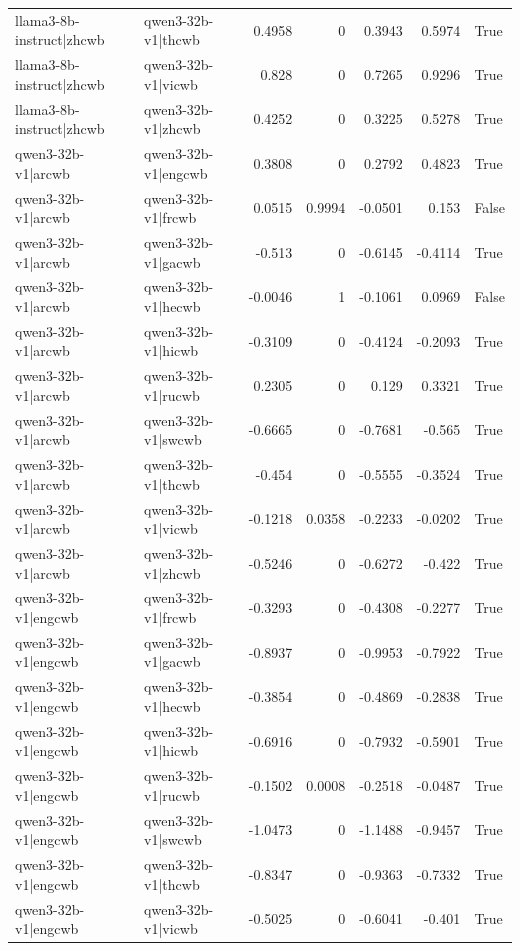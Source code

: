 \begin{table}
\begin{tabular}{l l r r r r l}
llama3-8b-instruct|zhcwb & qwen3-32b-v1|thcwb & 0.4958 & 0 & 0.3943 & 0.5974 & True \\
llama3-8b-instruct|zhcwb & qwen3-32b-v1|vicwb & 0.828 & 0 & 0.7265 & 0.9296 & True \\
llama3-8b-instruct|zhcwb & qwen3-32b-v1|zhcwb & 0.4252 & 0 & 0.3225 & 0.5278 & True \\
qwen3-32b-v1|arcwb & qwen3-32b-v1|engcwb & 0.3808 & 0 & 0.2792 & 0.4823 & True \\
qwen3-32b-v1|arcwb & qwen3-32b-v1|frcwb & 0.0515 & 0.9994 & -0.0501 & 0.153 & False \\
qwen3-32b-v1|arcwb & qwen3-32b-v1|gacwb & -0.513 & 0 & -0.6145 & -0.4114 & True \\
qwen3-32b-v1|arcwb & qwen3-32b-v1|hecwb & -0.0046 & 1 & -0.1061 & 0.0969 & False \\
qwen3-32b-v1|arcwb & qwen3-32b-v1|hicwb & -0.3109 & 0 & -0.4124 & -0.2093 & True \\
qwen3-32b-v1|arcwb & qwen3-32b-v1|rucwb & 0.2305 & 0 & 0.129 & 0.3321 & True \\
qwen3-32b-v1|arcwb & qwen3-32b-v1|swcwb & -0.6665 & 0 & -0.7681 & -0.565 & True \\
qwen3-32b-v1|arcwb & qwen3-32b-v1|thcwb & -0.454 & 0 & -0.5555 & -0.3524 & True \\
qwen3-32b-v1|arcwb & qwen3-32b-v1|vicwb & -0.1218 & 0.0358 & -0.2233 & -0.0202 & True \\
qwen3-32b-v1|arcwb & qwen3-32b-v1|zhcwb & -0.5246 & 0 & -0.6272 & -0.422 & True \\
qwen3-32b-v1|engcwb & qwen3-32b-v1|frcwb & -0.3293 & 0 & -0.4308 & -0.2277 & True \\
qwen3-32b-v1|engcwb & qwen3-32b-v1|gacwb & -0.8937 & 0 & -0.9953 & -0.7922 & True \\
qwen3-32b-v1|engcwb & qwen3-32b-v1|hecwb & -0.3854 & 0 & -0.4869 & -0.2838 & True \\
qwen3-32b-v1|engcwb & qwen3-32b-v1|hicwb & -0.6916 & 0 & -0.7932 & -0.5901 & True \\
qwen3-32b-v1|engcwb & qwen3-32b-v1|rucwb & -0.1502 & 0.0008 & -0.2518 & -0.0487 & True \\
qwen3-32b-v1|engcwb & qwen3-32b-v1|swcwb & -1.0473 & 0 & -1.1488 & -0.9457 & True \\
qwen3-32b-v1|engcwb & qwen3-32b-v1|thcwb & -0.8347 & 0 & -0.9363 & -0.7332 & True \\
qwen3-32b-v1|engcwb & qwen3-32b-v1|vicwb & -0.5025 & 0 & -0.6041 & -0.401 & True \\

\end{tabular}
\end{table}
